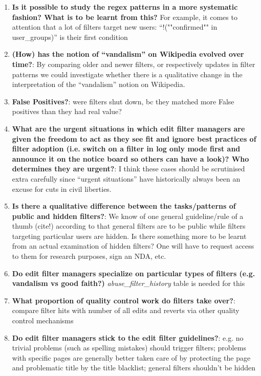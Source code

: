 \begin{enumerate}
\begin{comment}
Users are urged to use the term "vandalism" carefully, since it tends to offend and drive people away.
("When editors are editing in good faith, mislabeling their edits as vandalism makes them less likely to respond to corrective advice or to engage collaboratively during a disagreement,"~\cite{Wikipedia:Vandalism})
There are also various complaints/comments by users bewildered that their edits appear on an ``abuse log''
\end{comment}
    \item \textbf{Is it possible to study the regex patterns in a more systematic fashion? What is to be learnt from this?} For example, it comes to attention that a lot of filters target new users: ``!(""confirmed"" in user\_groups)'' is their first condition%
    \item \textbf{(How) has the notion of ``vandalism'' on Wikipedia evolved over time?}: By comparing older and newer filters, or respectively updates in filter patterns we could investigate whether there is a qualitative change in the interpretation of the ``vandalism'' notion on Wikipedia.
    \item \textbf{False Positives?}: were filters shut down, bc they matched more False positives than they had real value?
    \item \textbf{What are the urgent situations in which edit filter managers are given the freedom to act as they see fit and ignore best practices of filter adoption (i.e. switch on a filter in log only mode first and announce it on the notice board so others can have a look)? Who determines they are urgent?}: I think these cases should be scrutinised extra carefully since ``urgent situations'' have historically always been an excuse for cuts in civil liberties.
    \item \textbf{Is there a qualitative difference between the tasks/patterns of public and hidden filters?}: We know of one general guideline/rule of a thumb (cite!) according to that general filters are to be public while filters targeting particular users are hidden. Is there something more to be learnt from an actual examination of hidden filters? One will have to request access to them for research purposes, sign an NDA, etc.
    \item \textbf{Do edit filter managers specialize on particular types of filters (e.g. vandalism vs good faith?)} \emph{abuse\_filter\_history } table is needed for this
    \item \textbf{What proportion of quality control work do filters take over?}: compare filter hits with number of all edits and reverts via other quality control mechanisms
    \item \textbf{Do edit filter managers stick to the edit filter guidelines?}: e.g. no trivial problems (such as spelling mistakes) should trigger filters; problems with specific pages are generally better taken care of by protecting the page and problematic title by the title blacklist; general filters shouldn't be hidden
\end{enumerate}
